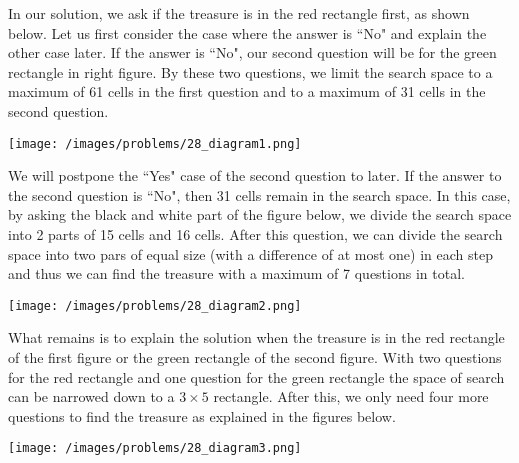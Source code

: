 \begin{solution}
In our solution, we ask if the treasure is in the  red rectangle first, as shown below. Let us first consider the case where the answer is ``No" and explain the other case later. If the answer is ``No", our second question will be for the green rectangle in right figure. By these two questions, we limit the search space to a maximum of 61 cells in the first question and to a maximum of 31 cells in the second question. 

\begin{center}
	\texttt{[image: /images/problems/28\_diagram1.png]}
\end{center}


 We will postpone the ``Yes" case of the second question to later. If the answer to the second question is ``No", then 31 cells remain in the search space. In this case, by asking the black and white part of the figure below, we divide the search space into 2 parts of 15 cells and 16 cells.  After this question, we can divide the search space into two pars of equal size (with a difference of at most one) in each step and thus we can find the treasure with a maximum of 7 questions in total.

\begin{center}
	\texttt{[image: /images/problems/28\_diagram2.png]}
\end{center}

 
 What remains is to explain the solution when the treasure is in the red rectangle of the first figure or the green rectangle of the second figure. With two questions for the red rectangle and one question for the green rectangle the space of search can be narrowed down to a  $3 \times 5$ rectangle. After this, we only need four more questions to find the treasure as explained in the figures below. 
 
\begin{center}
	\texttt{[image: /images/problems/28\_diagram3.png]}
\end{center}

\end{solution}
